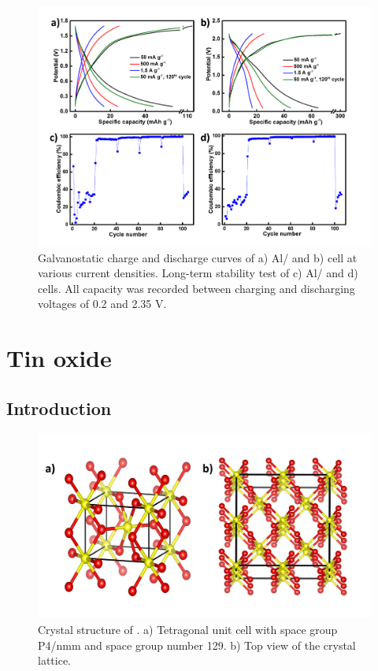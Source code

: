 \begin{figure}[h!]
  \centering
  \includegraphics[width=\textwidth]{Figures/chap6fig/MoX2YNCDCsCEs}
    \caption{Galvanostatic charge and discharge curves of a) Al/ and b)  cell at various current densities. Long-term stability test of c) Al/ and d)  cells. All capacity was recorded between charging and discharging voltages of 0.2 and 2.35 V.}
  \label{Figures/chap6fig:MoX2YNCDCsCEs}
\end{figure}

\section{Tin oxide}

\subsection{Introduction}

\begin{figure}[th!]
  \centering
  \includegraphics[width=\textwidth]{Figures/chap6fig/SnO2crys}
    \caption{Crystal structure of . a) Tetragonal unit cell with space group P4/nmm and space group number 129. b) Top view of the crystal lattice.}
  \label{Figures/chap6fig:SnO2crys}
  \end{figure}
  
